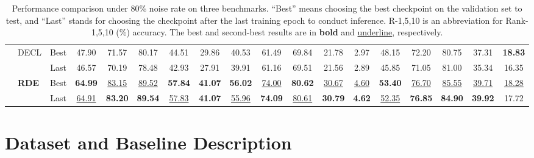 \documentclass[10pt,twocolumn,letterpaper]{article}
\begin{document}
\begin{table}[t]
{\begin{tabular}{c|lc|ccccc|ccccc|ccccc}
        &\multirow{2}{*}{DECL}&Best&47.90&71.57&80.17&44.51&29.86 &40.53&61.49&69.84&21.78&2.97&{48.15}&72.20&80.75&37.31&\textbf{18.83} \\
        &&Last&46.57&70.19&78.48&42.93&27.91&39.91&61.16&69.51&21.56&2.89&45.85&71.05&81.00&35.34&16.35\\
        &\multirow{2}{*}{\textbf{RDE}}&Best&\textbf{64.99} & \underline{83.15} & \underline{89.52} & \textbf{57.84} & \textbf{41.07}&\textbf{56.02} & \underline{74.00} &\textbf{80.62} & \underline{30.67} & \underline{4.60}&\textbf{53.40} & \underline{76.70} & \underline{85.55} & \underline{39.71} & \underline{18.28} \\
        
        &&Last&\underline{64.91} & \textbf{83.20} & \textbf{89.54} & \underline{57.83} & \textbf{41.07}&
\underline{55.96} & \textbf{74.09} & \underline{80.61} & \textbf{30.79} & \textbf{4.62}&\underline{52.35} & \textbf{76.85} & \textbf{84.90} & \textbf{39.92} & {17.72}\\





        \bottomrule[1pt]
    \end{tabular}}
\setlength{}
    \caption{Performance comparison under 80\% noise rate on three benchmarks. ``Best'' means choosing the best checkpoint on the validation set to test, and ``Last'' stands for choosing the checkpoint after the last training epoch to conduct inference. R-1,5,10 is an abbreviation for Rank-1,5,10 (\%) accuracy. The best and second-best results are in \textbf{bold} and \underline{underline}, respectively.}
    \label{tab80noise}
\end{table}
\section{Dataset and Baseline Description \label{app2}}
\end{document}
